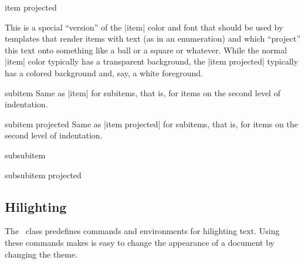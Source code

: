 \begin{element}{item projected}\no\yes\yes

  This is a special ``version'' of the |item| color and font that
  should be used by templates that render items with text (as in an
  enumeration) and which ``project'' this text onto something like
  a ball or a square or whatever. While the normal |item| color
  typically has a transparent background, the |item projected|
  typically has a colored background and, say, a white foreground.
\end{element}

\begin{element}{subitem}\no\yes\yes
  Same as |item| for subitems, that is, for items on the second level of
  indentation.
\end{element}

\begin{element}{subitem projected}\no\yes\yes
  Same as |item projected| for subitems, that is, for items on the
  second level of indentation.
\end{element}

\begin{element}{subsubitem}\no\yes\yes
\end{element}

\begin{element}{subsubitem projected}\no\yes\yes
\end{element}




\subsection{Hilighting}

The \beamer\ class predefines commands and environments for
hilighting text. Using these commands makes is easy to change the
appearance of a document by changing the theme.


